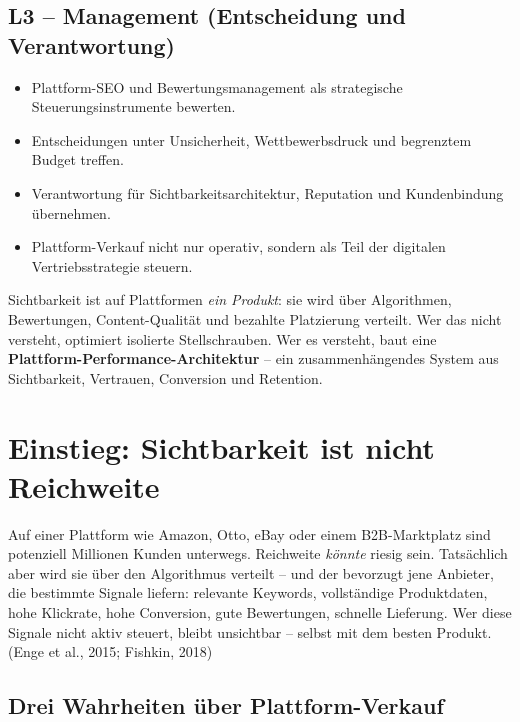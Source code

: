 \documentclass[11pt,a4paper,oneside]{article}
\newcommand{\quelle}[1]{{\footnotesize\color{lpGray}(#1)}}
\begin{document}
\subsection*{L3 -- Management (Entscheidung und Verantwortung)}
\begin{itemize}
  \item Plattform-SEO und Bewertungsmanagement als strategische Steuerungsinstrumente bewerten.
  \item Entscheidungen unter Unsicherheit, Wettbewerbsdruck und begrenztem Budget treffen.
  \item Verantwortung für Sichtbarkeitsarchitektur, Reputation und Kundenbindung übernehmen.
  \item Plattform-Verkauf nicht nur operativ, sondern als Teil der digitalen Vertriebsstrategie steuern.
\end{itemize}

\begin{merkbox}
Sichtbarkeit ist auf Plattformen \emph{ein Produkt}: sie wird über Algorithmen, Bewertungen, Content-Qualität und bezahlte Platzierung verteilt. Wer das nicht versteht, optimiert isolierte Stellschrauben. Wer es versteht, baut eine \textbf{Plattform-Performance-Architektur} -- ein zusammenhängendes System aus Sichtbarkeit, Vertrauen, Conversion und Retention.
\end{merkbox}

\clearpage

\section{Einstieg: Sichtbarkeit ist nicht Reichweite}

Auf einer Plattform wie Amazon, Otto, eBay oder einem B2B-Marktplatz sind potenziell Millionen Kunden unterwegs. Reichweite \emph{könnte} riesig sein. Tatsächlich aber wird sie über den Algorithmus verteilt -- und der bevorzugt jene Anbieter, die bestimmte Signale liefern: relevante Keywords, vollständige Produktdaten, hohe Klickrate, hohe Conversion, gute Bewertungen, schnelle Lieferung. Wer diese Signale nicht aktiv steuert, bleibt unsichtbar -- selbst mit dem besten Produkt. \quelle{Enge et al., 2015; Fishkin, 2018}

\subsection{Drei Wahrheiten über Plattform-Verkauf}
\end{document}
